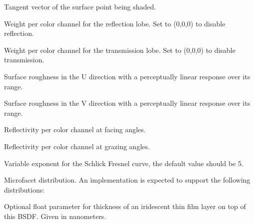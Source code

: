 \documentclass[11pt,letterpaper]{book}
\begin{document}
  \vspace{12pt}
  Tangent vector of the surface point being shaded.
  \apiend
  \vspace{-16pt}
  
  \vspace{12pt}
  Weight per color channel for the reflection lobe. Set to (0,0,0) to disable
  reflection.
  \apiend
  \vspace{-16pt}
  
  \vspace{12pt}
  Weight per color channel for the transmission lobe. Set to (0,0,0) to
  disable transmission.
  \apiend
  \vspace{-16pt}
  
  \vspace{12pt}
  Surface roughness in the U direction with a perceptually linear response
  over its range.
  \apiend
  \vspace{-16pt}
  
  \vspace{12pt}
  Surface roughness in the V direction with a perceptually linear response
  over its range.
  \apiend
  \vspace{-16pt}
  
  \vspace{12pt}
  Reflectivity per color channel at facing angles.
  \apiend
  \vspace{-16pt}
  
  \vspace{12pt}
  Reflectivity per color channel at grazing angles.
  \apiend
  \vspace{-16pt}
  
  \vspace{12pt}
  Variable exponent for the Schlick Fresnel curve, the default value should be
  5.
  \apiend
  \vspace{-16pt}
  
  \vspace{12pt}
  Microfacet distribution. An implementation is expected to support the
  following distributions: 
  \apiend
  \vspace{-16pt}
  
  \vspace{12pt}
  Optional float parameter for thickness of an iridescent thin film layer on
  top of this BSDF. Given in nanometers.
  \apiend
  \vspace{-16pt}
  
\end{document}
